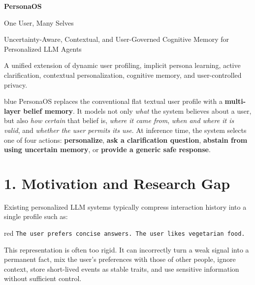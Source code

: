 \documentclass[10pt,a4paper]{article}
\begin{document}
\begin{tcolorbox}[enhanced, colback=navy, colframe=navy, arc=3mm, boxrule=0pt,
  left=6mm,right=6mm,top=6mm,bottom=6mm]
{\fontsize{23}{27}\selectfont\bfseries\color{white} PersonaOS}

\vspace{1mm}
{\Large\color{white} One User, Many Selves}

\vspace{2mm}
{\large\color{white!88} Uncertainty-Aware, Contextual, and User-Governed Cognitive Memory for Personalized LLM Agents}

\vspace{3mm}
{\small\color{white!80} A unified extension of dynamic user profiling, implicit persona learning, active clarification, contextual personalization, cognitive memory, and user-controlled privacy.}
\end{tcolorbox}

\begin{keybox}[title=Core Idea]{blue}
PersonaOS replaces the conventional flat textual user profile with a \textbf{multi-layer belief memory}. It models not only \emph{what} the system believes about a user, but also \emph{how certain} that belief is, \emph{where it came from}, \emph{when and where it is valid}, and \emph{whether the user permits its use}. At inference time, the system selects one of four actions: \textbf{personalize}, \textbf{ask a clarification question}, \textbf{abstain from using uncertain memory}, or \textbf{provide a generic safe response}.
\end{keybox}

\section{1. Motivation and Research Gap}

Existing personalized LLM systems typically compress interaction history into a single profile such as:

\begin{compactbox}{red}
\texttt{The user prefers concise answers. The user likes vegetarian food.}
\end{compactbox}

This representation is often too rigid. It can incorrectly turn a weak signal into a permanent fact, mix the user's preferences with those of other people, ignore context, store short-lived events as stable traits, and use sensitive information without sufficient control.
\end{document}
